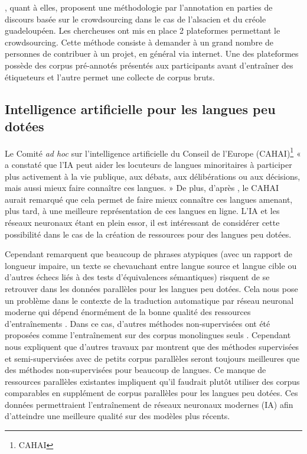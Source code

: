 \citet{millour_2018}, quant à elles, proposent une méthodologie par l'annotation en parties de discours basée sur le crowdsourcing dans le cas de l'alsacien et du créole guadeloupéen.
Les chercheuses ont mis en place 2 plateformes permettant le crowdsourcing. Cette méthode consiste à demander à un grand nombre de
personnes de contribuer à un projet, en général via internet. Une des plateformes possède des corpus pré-annotés
présentés aux participants avant d'entraîner des étiqueteurs et l'autre permet une collecte de corpus bruts.

\subsection{Intelligence artificielle pour les langues peu dotées}

Le Comité \textit{ad hoc} sur l’intelligence artificielle du Conseil de l’Europe (CAHAI)\footnote{\gls{CAHAI}}
{« }a constaté que l'IA peut aider les locuteurs de langues minoritaires à participer
plus activement à la vie publique, aux débats, aux délibérations ou aux décisions, mais aussi mieux
faire connaître ces langues.{ »} \citep{gerken_2022} De plus, d'après \citet{gerken_2022}, le CAHAI aurait remarqué que
cela permet de faire mieux connaître ces langues amenant, plus tard, à une meilleure représentation de
ces langues en ligne. L'IA et les réseaux neuronaux étant en plein essor,
il est intéressant de considérer cette possibilité dans le cas de la création de ressources pour des
langues peu dotées.

Cependant \citet{steingrimsson_2023} remarquent que beaucoup de \linebreak phrases atypiques (avec un
rapport de longueur impaire, un texte se chevauchant entre langue source et langue cible ou d'autres échecs
liés à des tests d'équivalences sémantiques) risquent de se retrouver dans les
données parallèles pour les langues peu dotées. Cela nous pose un problème dans le contexte de la traduction
automatique par réseau neuronal moderne qui dépend énormément de la bonne qualité des ressources
d'entraînements \citep{tan_2022}. Dans ce cas, d'autres méthodes non-supervisées ont été proposées comme
l'entraînement sur des corpus monolingues seuls \citep{artetxe_2018, lample_2018}. Cependant
\citet{steingrimsson_2021} nous expliquent que d'autres travaux par \citet{kim_2020} montrent que des méthodes
supervisées et semi-supervisées avec de petits corpus parallèles seront toujours meilleures que des méthodes
non-supervisées pour beaucoup de langues. Ce manque de ressources parallèles existantes impliquent qu'il
faudrait plutôt utiliser des corpus comparables en supplément de corpus parallèles pour les langues peu
dotées. Ces données permettraient l'entraînement de réseaux neuronaux modernes (IA) afin d'atteindre une
meilleure qualité sur des modèles plus récents.

